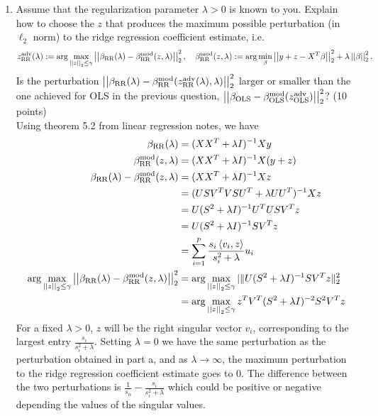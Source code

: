 \documentclass[11pt,twoside]{article}
\begin{document}
\begin{exam}
\begin{exercise}
\begin{problem}
\begin{enumerate}
\item Assume that the regularization parameter $\lambda > 0$ is known to you. Explain how to choose the $z$ that produces the maximum possible perturbation (in $\ell_2$ norm) to the ridge regression coefficient estimate, i.e. 
\begin{align}
z^{\operatorname{adv}}_{\operatorname{RR}}(\lambda) := \arg \max_{\left|\left| z \right|\right| _{2} \leq \gamma} \left|\left| \beta_{\operatorname{RR}}(\lambda) - \beta^{\operatorname{mod}}_{\operatorname{RR}}(z,\lambda) \right|\right| _{2}^2, \quad  \beta^{\operatorname{mod}}_{\operatorname{RR}}(z,\lambda) := \arg \min_{\beta} \left|\left| y+z - X^T\beta \right|\right| _{2}^2+\lambda \left|\left| \beta \right|\right| _{2}^2. \notag
\end{align}
Is the perturbation $\left|\left| \beta_{\operatorname{RR}}(\lambda) - \beta^{\operatorname{mod}}_{\operatorname{RR}}(z^{\operatorname{adv}}_{\operatorname{RR}}(\lambda),\lambda)  \right|\right| _{2}^2$ larger or smaller than the one achieved for OLS in the previous question, $\left|\left| \beta_{\operatorname{OLS}}  - \beta^{\operatorname{mod}}_{\operatorname{OLS}}(z^{\operatorname{adv}}_{\operatorname{OLS}} )  \right|\right| _{2}^2$?  (10 points)\\

Using theorem 5.2 from linear regression notes, we have 
\begin{align*}
	\beta_{\operatorname{RR}}(\lambda)										&=	(X X^T + \lambda I)^{-1} X y \\
	\beta^{\operatorname{mod}}_{\operatorname{RR}}(z,\lambda) 							&= 	(X X^T + \lambda I)^{-1} X (y + z) \\
	\beta_{\operatorname{RR}}(\lambda)	 -  \beta^{\operatorname{mod}}_{\operatorname{RR}}(z,\lambda)		&= 	(X X^T + \lambda I)^{-1}  X z \\
															&= 	(U S V^T V S U^T + \lambda UU^T) ^{-1}  X z \\
															&=    U (S^2 + \lambda I)^{-1} U^T U S V^T z \\
															&= 	U  (S^2 + \lambda I)^{-1}  S V^T z \\
															&= 	\sum_{i=1}^p	\frac{s_i \left \langle v_i, z\right \rangle} {s_i^2 + \lambda} u_i \\ 
 \arg \max_{\left|\left| z \right|\right| _{2} \leq \gamma} \left|\left| \beta_{\operatorname{RR}}(\lambda) - \beta^{\operatorname{mod}}_{\operatorname{RR}}(z,\lambda) \right|\right| _{2}^2 &=
 								 \arg \max_{\left|\left| z \right|\right| _{2} \leq \gamma}   |\| U  (S^2 + \lambda I)^{-1}  S V^T z  \|_2^2 \\	
								 &=  \arg \max_{\left|\left| z \right|\right| _{2} \leq \gamma}  z^T V^T (S^2 + \lambda I)^{-2} S^2 V^T z	\\						
\end{align*}
For a fixed $\lambda > 0$, $z$ will be the right singular vector $v_i$, corresponding to the largest entry $\frac{s_i} {s_i^2 + \lambda}$.
Setting $\lambda = 0$ we have the same perturbation as the perturbation obtained in part a, and as $\lambda \rightarrow \infty$, the maximum perturbation to the ridge regression coefficient estimate goes to $0$.
The difference between the two perturbations is $\frac{1} {s_n} - \frac{s_i} {s_i^2 + \lambda}$ which could be positive or negative depending the values of the singular values.



\end{enumerate}
\end{problem}
\end{exercise}
\end{exam}
\end{document}
